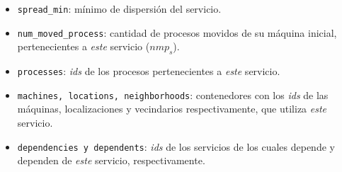 \documentclass[../informe2.tex]{subfiles}
\begin{document}
\noindent\begin{minipage}{0.5\textwidth}
	\small
	\begin{itemize}
		\item \texttt{spread\_min}: mínimo de dispersión del servicio.
		\item \texttt{num\_moved\_process}: cantidad de procesos movidos de su máquina inicial, pertenecientes a \textit{este} servicio ($nmp_s$).
		\item \texttt{processes}: \textit{ids} de los procesos pertenecientes a \textit{este} servicio.
 		\item \texttt{machines, locations, neighborhoods}: contenedores con los \textit{ids} de las máquinas, localizaciones y vecindarios respectivamente, que utiliza \textit{este} servicio.
 		\item \texttt{dependencies y dependents}: \textit{ids} de los servicios de los cuales depende y dependen de \textit{este} servicio, respectivamente.
	\end{itemize}
\end{minipage}\hfill
\begin{minipage}{0.4\textwidth}
\end{minipage}

\bigskip
\end{document}
